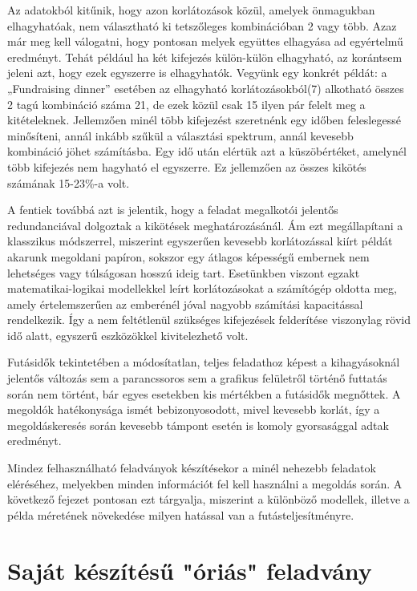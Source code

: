 \documentclass[12pt,a4paper,twoside, openright]{report}
\begin{document}
    Az adatokból kitűnik, hogy azon korlátozások közül, amelyek önmagukban elhagyhatóak, nem választható ki tetszőleges kombinációban 2 vagy több.
    Azaz már meg kell válogatni, hogy pontosan melyek együttes elhagyása ad egyértelmű eredményt.
    Tehát például ha két kifejezés külön-külön elhagyható, az korántsem jeleni azt, hogy ezek egyszerre is elhagyhatók.
    Vegyünk egy konkrét példát: a „Fundraising dinner” esetében az elhagyható korlátozásokból(7) alkotható összes 2 tagú kombináció száma 21, de ezek közül csak 15 ilyen pár felelt meg a kitételeknek.
    Jellemzően minél több kifejezést szeretnénk egy időben feleslegessé minősíteni, annál inkább szűkül a választási spektrum, annál kevesebb kombináció jöhet számításba.
    Egy idő után elértük azt a küszöbértéket, amelynél több kifejezés nem hagyható el egyszerre.
    Ez jellemzően az összes kikötés számának 15-23\%-a volt.
    
    A fentiek továbbá azt is jelentik, hogy a feladat megalkotói jelentős redundanciával dolgoztak a kikötések meghatározásánál.
    Ám ezt megállapítani a klasszikus módszerrel, miszerint egyszerűen kevesebb korlátozással kiírt példát akarunk megoldani papíron, sokszor egy átlagos képességű embernek nem lehetséges vagy túlságosan hosszú ideig tart.
    Esetünkben viszont egzakt matematikai-logikai modellekkel leírt korlátozásokat a számítógép oldotta meg, amely értelemszerűen az emberénél jóval nagyobb számítási kapacitással rendelkezik.
    Így a nem feltétlenül szükséges kifejezések felderítése viszonylag rövid idő alatt, egyszerű eszközökkel kivitelezhető volt.
    
    Futásidők tekintetében a módosítatlan, teljes feladathoz képest a kihagyásoknál jelentős változás sem a parancssoros sem a grafikus felületről történő futtatás során nem történt, bár egyes esetekben kis mértékben a futásidők megnőttek.
    A megoldók hatékonysága ismét bebizonyosodott, mivel kevesebb korlát, így a megoldáskeresés során kevesebb támpont esetén is komoly gyorsasággal adtak eredményt.
    
    Mindez felhasználható feladványok készítésekor a minél nehezebb feladatok eléréséhez, melyekben minden információt fel kell használni a megoldás során. A következő fejezet pontosan ezt tárgyalja, miszerint a különböző modellek, illetve a példa méretének növekedése milyen hatással van a futásteljesítményre.
    
    \chapter{Saját készítésű "óriás" feladvány}
    
\end{document}
